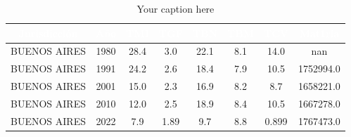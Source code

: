\begin{table}[htb]
\centering
\begin{tabular}{|c|c|c|c|c|c|c|c|}
\hline
\textbf{\cellcolor[rgb]{0,0.231,0.427}\textcolor{white}{Jurisdicción}} & \textbf{\cellcolor[rgb]{0,0.231,0.427}\textcolor{white}{Año}} & \textbf{\cellcolor[rgb]{0,0.231,0.427}\textcolor{white}{TMI}} & \textbf{\cellcolor[rgb]{0,0.231,0.427}\textcolor{white}{TGF}} & \textbf{\cellcolor[rgb]{0,0.231,0.427}\textcolor{white}{TBN}} & \textbf{\cellcolor[rgb]{0,0.231,0.427}\textcolor{white}{TBM}} & \textbf{\cellcolor[rgb]{0,0.231,0.427}\textcolor{white}{TCV}} & \textbf{\cellcolor[rgb]{0,0.231,0.427}\textcolor{white}{Mat1ria}} \\ \hline
BUENOS AIRES & 1980 & 28.4 & 3.0 & 22.1 & 8.1 & 14.0 & nan \\
BUENOS AIRES & 1991 & 24.2 & 2.6 & 18.4 & 7.9 & 10.5 & 1752994.0 \\
BUENOS AIRES & 2001 & 15.0 & 2.3 & 16.9 & 8.2 & 8.7 & 1658221.0 \\
BUENOS AIRES & 2010 & 12.0 & 2.5 & 18.9 & 8.4 & 10.5 & 1667278.0 \\
BUENOS AIRES & 2022 & 7.9 & 1.89 & 9.7 & 8.8 & 0.899 & 1767473.0 \\
\hline
\end{tabular}
\caption{Your caption here}
\label{tab:my_table}
\end{table}
